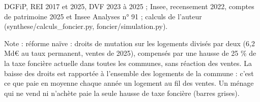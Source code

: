 DGFiP, REI 2017 et 2025, DVF 2023 à 2025 ; Insee, recensement 2022, comptes de patrimoine 2025 et Insee Analyses n° 91 ; calculs de l'auteur (synthese/calculs\_foncier.py, foncier/simulation.py).\par Note : réforme naïve : droits de mutation sur les logements divisés par deux (6,2 Md\euro{} au taux permanent, ventes de 2025), compensés par une hausse de 25 \% de la taxe foncière actuelle dans toutes les communes, sans réaction des ventes. La baisse des droits est rapportée à l'ensemble des logements de la commune : c'est ce que paie en moyenne chaque année un logement au fil des ventes. Un ménage qui ne vend ni n'achète paie la seule hausse de taxe foncière (barres grises).
